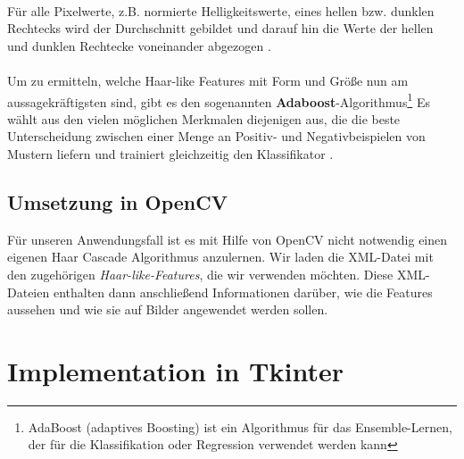 \documentclass{article}
\begin{document}
\ \\
Für alle Pixelwerte, z.B. normierte Helligkeitswerte, eines hellen bzw. dunklen Rechtecks wird der Durchschnitt gebildet und darauf hin die Werte der hellen und dunklen Rechtecke voneinander abgezogen \cite{drei}. \\ \\
Um zu ermitteln, welche Haar-like Features mit Form und Größe nun am
aussagekräftigsten sind,  gibt es den sogenannten
\textbf{Adaboost}-Algorithmus\footnote{AdaBoost (adaptives Boosting) ist ein Algorithmus für das Ensemble-Lernen, der für die Klassifikation oder Regression verwendet werden kann} 
Es wählt aus den vielen möglichen Merkmalen diejenigen aus, die die beste Unterscheidung zwischen einer Menge an Positiv- und Negativbeispielen von Mustern liefern und trainiert gleichzeitig den Klassifikator \cite{drei}.
\newpage
\subsection{Umsetzung in OpenCV}
Für unseren Anwendungsfall ist es mit Hilfe von OpenCV nicht notwendig einen eigenen Haar Cascade  Algorithmus anzulernen. Wir laden die XML-Datei mit den zugehörigen \textit{Haar-like-Features}, die wir verwenden möchten. Diese XML-Dateien enthalten dann anschließend Informationen darüber, wie die Features aussehen und wie sie auf Bilder angewendet werden sollen. 
\ \\ 
\section{Implementation in Tkinter}
\end{document}
